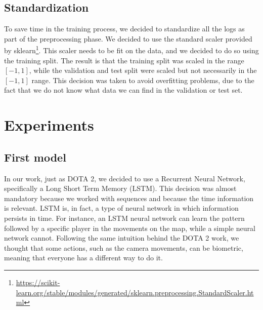 	\subsection{Standardization}

		To save time in the training process, we decided to standardize all the logs as part of the preprocessing phase. We decided to use the standard scaler provided by sklearn\footnote{\href{https://scikit-learn.org/stable/modules/generated/sklearn.preprocessing.StandardScaler.html}{https://scikit-learn.org/stable/modules/generated/sklearn.preprocessing.StandardScaler.html}}. 
		This scaler needs to be fit on the data, and we decided to do so using the training split. 
		The result is that the training split was scaled in the range $[-1, 1]$, while the validation and test split were scaled but not necessarily in the $[-1, 1]$ range. 
		This decision was taken to avoid overfitting problems, due to the fact that we do not know what data we can find in the validation or test set.


\section{\label{sec:exp}Experiments}

	\subsection{First model}
			
		In our work, just as DOTA 2, we decided to use a Recurrent Neural Network, specifically a Long Short Term Memory (LSTM). 
		This decision was almost mandatory because we worked with sequences and because the time information is relevant. 
		LSTM is, in fact, a type of neural network in which information persists in time. 
		For instance, an LSTM neural network can learn the pattern followed by a specific player in the movements on the map, while a simple neural network cannot.
		Following the same intuition behind the DOTA 2 work, we thought that some actions, such as the camera movements, can be biometric, meaning that everyone has a different way to do it.\\
		
